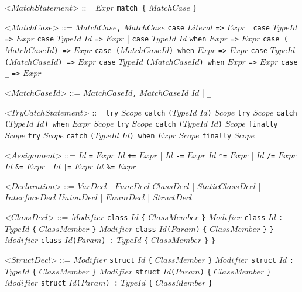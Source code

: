\documentclass{article}
\newcommand{\gtext}[1]{<$#1$>}
\newcommand{\glit}[1]{\texttt{#1}}
\begin{document}
\begin{grammar}
	\newpage	
	
	\gtext{MatchStatement} ::= $Expr$ \glit{match \{} $MatchCase$ \glit{\}} 
	
	\gtext{MatchCase} ::= $MatchCase$\glit{,} $MatchCase$
	\alt \glit{case} $Literal$ \glit{=>} $Expr$ | \glit{case} $TypeId$ \glit{=>} $Expr$ 
	\alt \glit{case} $TypeId$ $Id$ \glit{=>} $Expr$ | \glit{case} $TypeId$ $Id$ \glit{when} $Expr$ \glit{=>} $Expr$ 
	\alt \glit{case (}$MatchCaseId$\glit{) =>} $Expr$
	\alt \glit{case (}$MatchCaseId$\glit{) when} $Expr$ \glit{=>} $Expr$ 
	\alt \glit{case} $TypeId$ \glit{(}$MatchCaseId$\glit{) =>} $Expr$
	\alt \glit{case} $TypeId$ \glit{(}$MatchCaseId$\glit{) when} $Expr$ \glit{=>} $Expr$ 
	\alt \glit{case} \glit{_} \glit{=>} $Expr$
	
	\gtext{MatchCaseId} ::= $MatchCaseId$\glit{,} $MatchCaseId$
	\alt $Id$ | \glit{_}

	\gtext{TryCatchStatement} ::= \glit{try} $Scope$ \glit{catch} \glit{(}$TypeId$ $Id$\glit{)} $Scope$
	\alt \glit{try} $Scope$ \glit{catch} \glit{(}$TypeId$ $Id$\glit{) when} $Expr$ $Scope$  
	\alt \glit{try} $Scope$ \glit{catch} \glit{(}$TypeId$ $Id$\glit{)} $Scope$ \glit{finally} $Scope$
	\alt \glit{try} $Scope$ \glit{catch} \glit{(}$TypeId$ $Id$\glit{) when} $Expr$ $Scope$ \glit{finally} $Scope$

	\gtext{Assignment} ::= $Id$ \glit{=} $Expr$
	\alt $Id$ \glit{+=} $Expr$ | $Id$ \glit{-=} $Expr$
	\alt $Id$ \glit{*=} $Expr$ | $Id$ \glit{/=} $Expr$
	\alt $Id$ \glit{\&=} $Expr$ | $Id$ \glit{|=} $Expr$
	\alt $Id$ \glit{\%=} $Expr$
	
	\gtext{Declaration} ::=  $VarDecl$ | $FuncDecl$ %
	\alt $ClassDecl$ | $StaticClassDecl$ |  $InterfaceDecl$ %
	\alt $UnionDecl$ | $EnumDecl$ | $StructDecl$ %
	
	\gtext{ClassDecl} ::= $Modifier$ \glit{class} $Id$ \glit{\{} $ClassMember$ \glit{\}}
	\alt $Modifier$ \glit{class} $Id$ \glit{:} $TypeId$ \glit{\{} $ClassMember$ \glit{\}}
	\alt $Modifier$ \glit{class} $Id$\glit{(}$Param$\glit{)} \glit{\{} $ClassMember$ \glit{\}} \glit{\}}
	\alt $Modifier$ \glit{class} $Id$\glit{(}$Param$\glit{) :} $TypeId$ \glit{\{} $ClassMember$ \glit{\}} \glit{\}}
	
	\gtext{StructDecl} ::= $Modifier$ \glit{struct} $Id$ \glit{\{} $ClassMember$ \glit{\}}
	\alt $Modifier$ \glit{struct} $Id$ \glit{:} $TypeId$ \glit{\{} $ClassMember$ \glit{\}}
	\alt $Modifier$ \glit{struct} $Id$\glit{(}$Param$\glit{)} \glit{\{} $ClassMember$ \glit{\}}
	\alt $Modifier$ \glit{struct} $Id$\glit{(}$Param$\glit{) :} $TypeId$ \glit{\{} $ClassMember$ \glit{\}}
	

\end{grammar}
\end{document}

